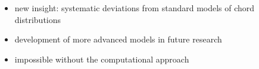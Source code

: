 \begin{frame}{\insertsectionhead}
  \begin{itemize}
    \item<1-> \alert{new insight}: systematic deviations from standard models of chord distributions
    \item<2-> development of more advanced models in future research
    \item<3-> impossible without the computational approach
  \end{itemize}

\end{frame}

